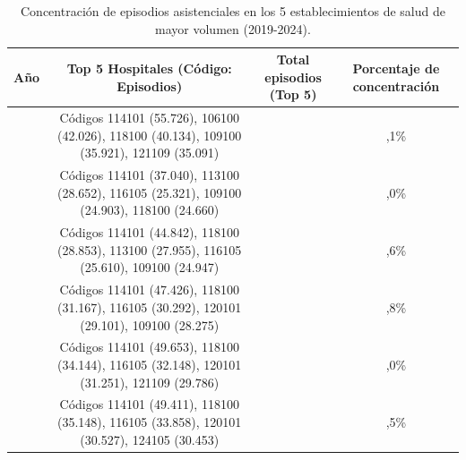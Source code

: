 \begin{table}[htbp]
\centering
\scriptsize
\setlength{\tabcolsep}{4pt}
\renewcommand{\arraystretch}{1.4}
\caption{Concentración de episodios asistenciales en los 5 establecimientos de salud de mayor volumen (2019-2024).}
\label{tab:concentracion_hospitales}
\begin{tabular}{|c|c|c|c|}
\hline
\parbox[t]{1.2cm}{\centering\textbf{Año}} & 
\parbox[t]{6.5cm}{\centering\textbf{Top 5 Hospitales (Código: Episodios)}} & 
\parbox[t]{2.2cm}{\centering\textbf{Total episodios\\(Top 5)}} & 
\parbox[t]{2.2cm}{\centering\textbf{Porcentaje de concentración}} \\ \hline

\parbox[t]{1.2cm}{} & 
\parbox[t]{6.5cm}{\raggedright Códigos 114101 (55.726), 106100 (42.026), 118100 (40.134), 109100 (35.921), 121109 (35.091)} & 
\parbox[t]{2.2cm}{} & 
\parbox[t]{2.2cm}{,1\%} \\ \hline

\parbox[t]{1.2cm}{} & 
\parbox[t]{6.5cm}{\raggedright Códigos 114101 (37.040), 113100 (28.652), 116105 (25.321), 109100 (24.903), 118100 (24.660)} & 
\parbox[t]{2.2cm}{} & 
\parbox[t]{2.2cm}{,0\%} \\ \hline

\parbox[t]{1.2cm}{} & 
\parbox[t]{6.5cm}{\raggedright Códigos 114101 (44.842), 118100 (28.853), 113100 (27.955), 116105 (25.610), 109100 (24.947)} & 
\parbox[t]{2.2cm}{} & 
\parbox[t]{2.2cm}{,6\%} \\ \hline

\parbox[t]{1.2cm}{} & 
\parbox[t]{6.5cm}{\raggedright Códigos 114101 (47.426), 118100 (31.167), 116105 (30.292), 120101 (29.101), 109100 (28.275)} &
\parbox[t]{2.2cm}{} & 
\parbox[t]{2.2cm}{,8\%} \\ \hline

\parbox[t]{1.2cm}{} & 
\parbox[t]{6.5cm}{\raggedright Códigos 114101 (49.653), 118100 (34.144), 116105 (32.148), 120101 (31.251), 121109 (29.786)} & 
\parbox[t]{2.2cm}{} & 
\parbox[t]{2.2cm}{,0\%} \\ \hline

\parbox[t]{1.2cm}{} & 
\parbox[t]{6.5cm}{\raggedright Códigos 114101 (49.411), 118100 (35.148), 116105 (33.858), 120101 (30.527), 124105 (30.453)} & 
\parbox[t]{2.2cm}{} & 
\parbox[t]{2.2cm}{,5\%} \\ \hline
\end{tabular}
\end{table}

